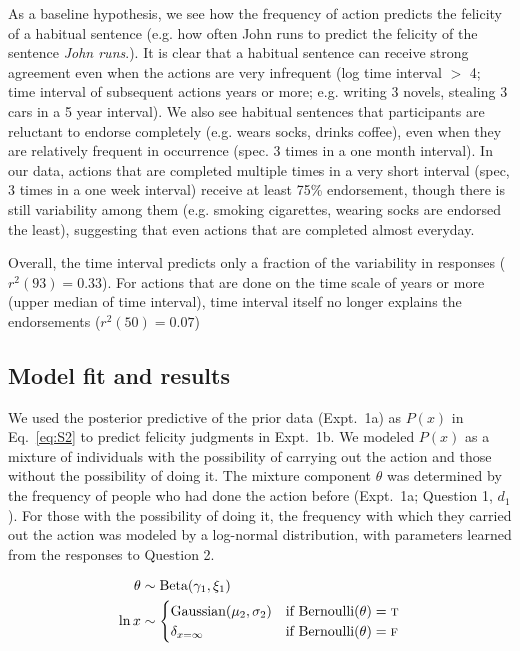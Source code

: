 \documentclass[10pt,letterpaper]{article}
\begin{document}
As a baseline hypothesis, we see how the frequency of action predicts the felicity of a habitual sentence (e.g. how often John runs to predict the felicity of the sentence \emph{John runs}.). 
It is clear that a habitual sentence can receive strong agreement even when the actions are very infrequent (log time interval $>$ 4; time interval of subsequent actions years or more; e.g. writing 3 novels, stealing 3 cars in a 5 year interval).
We also see habitual sentences that participants are reluctant to endorse completely (e.g. wears socks, drinks coffee), even when they are relatively frequent in occurrence (spec. 3 times in a one month interval).
In our data, actions that are completed multiple times in a very short interval (spec, 3 times in a one week interval) receive at least 75\% endorsement, though there is still variability among them (e.g. smoking cigarettes, wearing socks are endorsed the least), suggesting that even actions that are completed almost everyday.



Overall, the time interval predicts only a fraction of the variability in responses ($r^2(93) = 0.33$).
For actions that are done on the time scale of years or more (upper median of time interval), time interval itself no longer explains the endorsements  ($r^2(50) = 0.07$)


\subsection{Model fit and results}

We used the posterior predictive of the prior data (Expt.~1a) as  $P(x)$  in Eq.~\ref{eq:S2} to predict felicity judgments in Expt.~1b.
We modeled $P(x)$ as a mixture of individuals with the possibility of carrying out the action and those without the possibility of doing it. 
The mixture component $\theta$ was determined by the frequency of people who had done the action before (Expt.~1a; Question 1, $d_1$). 
For those with the possibility of doing it, the frequency with which they carried out the action was modeled by a log-normal distribution, with parameters learned from the responses to Question 2. 

\begin{minipage}{0.5 \textwidth} \small
\begin{align*}
\theta & \sim \text{Beta}(\gamma_{1}, \xi_{1}) \\ 
\ln x & \sim \begin{cases} 
		\text{Gaussian}(\mu_{2}, \sigma_{2}) &\mbox{if } \text{Bernoulli}(\theta) = \textsc{t} \\
				\delta_{x=\infty} &\mbox{if } \text{Bernoulli}(\theta) = \textsc{f} \\
		\end{cases} \\
\end{align*}
\end{minipage}
\end{document}
